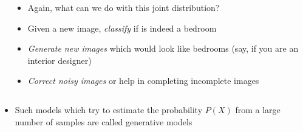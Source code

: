 \begin{frame}
\begin{columns}
\begin{overlayarea}{\textwidth}{\textheight}
		\end{overlayarea}
		\begin{overlayarea}{\textwidth}{\textheight}
			\begin{itemize}\justifying
				\item<1-> Again, what can we do with this joint distribution?
				\item<2-> Given a new image, \textit{classify} if is indeed a bedroom
				\item<3-> \textit{Generate new images} which would look like bedrooms (say, if you are an interior designer)
				\item<4-> \textit{Correct noisy images} or help in completing incomplete images
			\end{itemize}
		\end{overlayarea}
	\end{columns}
\end{frame}

\begin{frame}
\begin{block}{}
\begin{itemize}
\item Such models which try to estimate the probability $P(X)$ from a large number of samples are called generative models
\end{itemize}
\end{block}
\end{frame}

